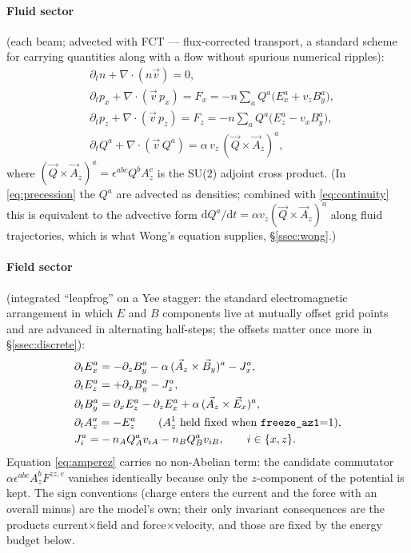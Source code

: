 \documentclass[11pt,a4paper]{article}
\numberwithin{equation}{section}
\theoremstyle{remark}
\newcommand{\dd}{\mathrm{d}}
\begin{document}
\paragraph{Fluid sector} (each beam; advected with FCT ---
flux-corrected transport, a standard scheme for carrying quantities
along with a flow without spurious numerical ripples):
\begin{align}
&\partial_t n+\nabla\!\cdot\!(n\vec v)=0,
\label{eq:continuity}\\
&\partial_t p_x+\nabla\!\cdot\!(\vec v\,p_x)=F_x
=-n\sum_a Q^a\bigl(E_x^a+v_zB_y^a\bigr),
\label{eq:momx}\\
&\partial_t p_z+\nabla\!\cdot\!(\vec v\,p_z)=F_z
=-n\sum_a Q^a\bigl(E_z^a-v_xB_y^a\bigr),
\label{eq:momz}\\
&\partial_t Q^a+\nabla\!\cdot\!(\vec v\,Q^a)
=\alpha\,v_z\,(\vec Q\times\vec A_z)^a ,
\label{eq:precession}
\end{align}
where $(\vec Q\times \vec A_z)^a=\epsilon^{abc}Q^bA_z^c$ is the SU(2)
adjoint cross product. (In \eqref{eq:precession} the $Q^a$ are advected as
densities; combined with \eqref{eq:continuity} this is equivalent to the
advective form $\dd Q^a/\dd t=\alpha v_z(\vec Q\times\vec A_z)^a$ along
fluid trajectories, which is what Wong's equation supplies,
\S\ref{ssec:wong}.)

\paragraph{Field sector} (integrated ``leapfrog'' on a Yee stagger:
the standard electromagnetic arrangement in which $E$ and $B$ components
live at mutually offset grid points and are advanced in alternating
half-steps; the offsets matter once more in \S\ref{ssec:discrete}):
\begin{align}
&\partial_t E_x^a=-\partial_z B_y^a-\alpha\,(\vec A_z\times\vec B_y)^a
-J_x^a ,
\label{eq:amperex}\\
&\partial_t E_z^a=+\partial_x B_y^a-J_z^a ,
\label{eq:amperez}\\
&\partial_t B_y^a=\partial_x E_z^a-\partial_z E_x^a
+\alpha\,(\vec A_z\times\vec E_x)^a ,
\label{eq:faraday}\\
&\partial_t A_z^a=-E_z^a
\qquad(\text{$A_z^1$ held fixed when \texttt{freeze\_az1}=1}),
\label{eq:potential}\\
&J_i^a=-\,n_AQ^a_Av_{iA}-n_BQ^a_Bv_{iB},\qquad i\in\{x,z\} .
\label{eq:currents}
\end{align}
Equation \eqref{eq:amperez} carries no non-Abelian term: the candidate
commutator $\alpha\epsilon^{abc}A_z^bF^{zz,c}$ vanishes identically because
only the $z$-component of the potential is kept. The sign conventions
(charge enters the current and the force with an overall minus) are the
model's own; their only invariant consequences are the products
current$\times$field and force$\times$velocity, and those are fixed by the
energy budget below.
\end{document}
